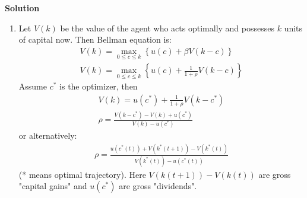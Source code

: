 \documentclass[a4paper]{article}
\begin{document}
\textbf{Solution}

\begin{enumerate}
	\item Let $V(k)$ be the value of the agent who acts optimally and possesses $k$ units of capital now. Then Bellman equation is:
	\begin{align*}
	V(k) = \underset{0 \le c \le k}{\max}\left\{u(c) + \beta V(k - c)\right\} \\
	V(k) = \underset{0 \le c \le k}{\max}\left\{u(c) + \frac{1}{1+\rho} V(k - c)\right\} 
	\end{align*}
	Assume $c^*$ is the optimizer, then
	\begin{align*}
	V(k) = u(c^*) + \frac{1}{1+\rho}V(k-c^*)\\
	\rho = \frac{V(k - c^*) - V(k) + u(c^*)}{V(k) - u(c^*)}
	\end{align*}
	or alternatively:
	\begin{align*}
	\rho = \frac{u(c^*(t)) + V(k^*(t+1)) - V(k^*(t))}{V(k^*(t)) - u(c^*(t))}
	\end{align*}
	(* means optimal trajectory).
	Here $V(k(t+1)) - V(k(t))$ are gross "capital gains" and $u(c^*)$ are gross "dividends". 
	

\end{enumerate}
\end{document}
